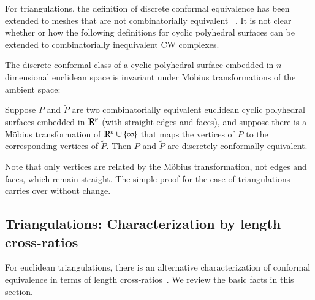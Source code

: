 \documentclass[Thesis]{subfiles}
\begin{document}
\begin{remark}
  \label{rem:change_combi}
  For triangulations, the definition of discrete conformal equivalence
  has been extended to meshes that are not combinatorially
  equivalent~\cite[Definition 5.1.4]{BPS2015:dconf}
  \cite{Luo-Uniformization, Luo-Uniformization_II}. It is not
  clear whether or how the following definitions for cyclic polyhedral
  surfaces can be extended to combinatorially inequivalent CW
  complexes.
\end{remark}


The discrete conformal class of a cyclic polyhedral surface embedded
in $n$-dimensional euclidean space is invariant under M{\"o}bius
transformations of the ambient space:

\begin{proposition}
  \label{prop:Moebius_inv}
  Suppose $P$ and $\tilde P$ are two combinatorially equivalent
  euclidean cyclic polyhedral surfaces embedded in $\mathbb R^{n}$ (with
  straight edges and faces), and suppose there is a M{\"o}bius
  transformation of\/ $\mathbb R^{n}\cup\{\infty\}$ that maps the vertices of
  $P$ to the corresponding vertices of $\tilde P$. Then $P$ and
  $\tilde P$ are discretely conformally equivalent.
\end{proposition}

\noindent%
Note that only vertices are related by the M{\"o}bius transformation,
not edges and faces, which remain straight. The simple proof for the
case of triangulations~\cite{BPS2015:dconf} carries over without change.

\subsection{Triangulations: Characterization by length cross-ratios}
\label{sec:triangulations}
For euclidean triangulations, there is an alternative characterization
of conformal equivalence in terms of length
cross-ratios~\cite{BPS2015:dconf}. We review the basic facts in this
section.
\end{document}
